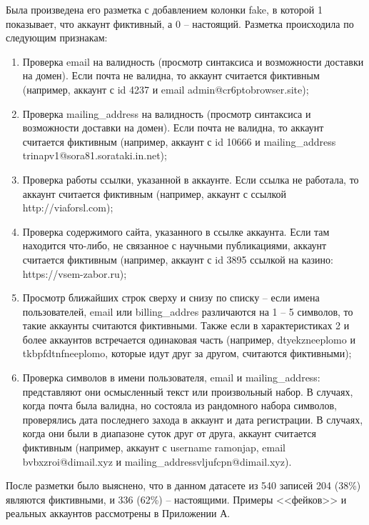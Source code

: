 Была произведена его разметка с добавлением колонки fake, в которой 1 показывает, что аккаунт фиктивный, а 0 -- настоящий. 
Разметка происходила по следующим признакам:
\vspace{-1.5em}
\begin{enumerate}[itemsep=0pt, topsep=1.5em]
    \item Проверка email на валидность (просмотр синтаксиса и возможности доставки на домен). Если почта не валидна, то аккаунт считается фиктивным (например, аккаунт с id 4237 и email admin@cr6ptobrowser.site);
    \item Проверка mailing\_address на валидность (просмотр синтаксиса и возможности доставки на домен). Если почта не валидна, то аккаунт считается фиктивным (например, аккаунт с id 10666 и mailing\_address trinapv1@sora81.sorataki.in.net);
    \item Проверка работы ссылки, указанной в аккаунте. Если ссылка не работала, то аккаунт считается фиктивным (например, аккаунт с ссылкой http://viaforsl.com);
    \item Проверка содержимого сайта, указанного в ссылке аккаунта. Если там находится что-либо, не связанное с научными публикациями, аккаунт считается фиктивным (например, аккаунт с id 3895 ссылкой на казино: https://vsem-zabor.ru);
    \item Просмотр ближайших строк сверху и снизу по списку -- если имена пользователей, email или billing\_addres различаются на 1 -- 5 символов, то такие аккаунты считаются фиктивными. Также если в характеристиках 2 и более аккаунтов встречается одинаковая часть (например, dtyekzneeplomo и tkbpfdtnfneeplomo, которые идут друг за другом, считаются фиктивными);
    \item Проверка символов в имени пользователя, email и mailing\_address: представляют они осмысленный текст или произвольный набор. В случаях, когда почта была валидна, но состояла из рандомного набора символов, проверялись дата последнего захода в аккаунт и дата регистрации. В случаях, когда они были в диапазоне суток друг от друга, аккаунт считается фиктивным (например, аккаунт с username ramonjap, email bvbxzroi@dimail.xyz и mailing\_addressvljufcpn@dimail.xyz).
\end{enumerate}
\vspace{-1.5em}

После разметки было выяснено, что в данном датасете из 540 записей 204 (38\%) являются фиктивными, и 336 (62\%) -- настоящими. Примеры <<фейков>> и реальных аккаунтов рассмотрены в Приложении А.

